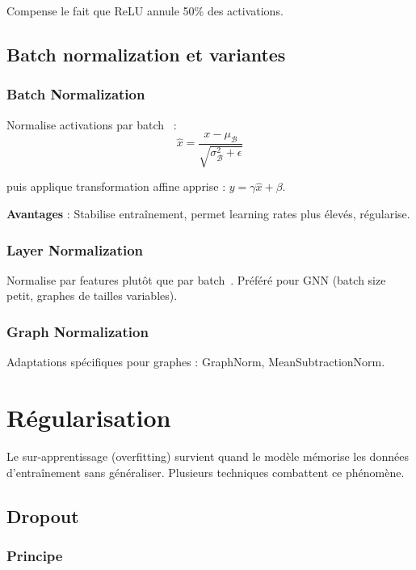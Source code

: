 Compense le fait que ReLU annule 50\% des activations.

\subsection{Batch normalization et variantes}

\subsubsection{Batch Normalization}

Normalise activations par batch~\cite{Ioffe2015} :
\[
\hat{x} = \frac{x - \mu_\mathcal{B}}{\sqrt{\sigma_\mathcal{B}^2 + \epsilon}}
\]

puis applique transformation affine apprise : $y = \gamma \hat{x} + \beta$.

\textbf{Avantages} : Stabilise entraînement, permet learning rates plus élevés, régularise.

\subsubsection{Layer Normalization}

Normalise par features plutôt que par batch~\cite{Ba2016}. Préféré pour GNN (batch size petit, graphes de tailles variables).

\subsubsection{Graph Normalization}

Adaptations spécifiques pour graphes : GraphNorm, MeanSubtractionNorm.

\section{Régularisation}

Le sur-apprentissage (overfitting) survient quand le modèle mémorise les données d'entraînement sans généraliser. Plusieurs techniques combattent ce phénomène.

\subsection{Dropout}

\subsubsection{Principe}

